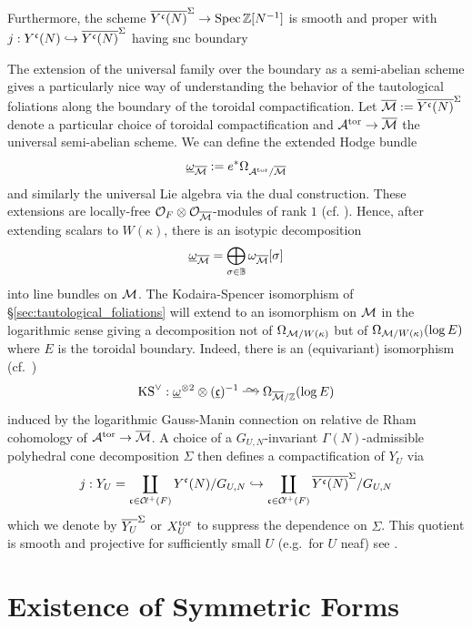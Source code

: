 \documentclass[main.tex]{subfiles}
\begin{document}
{Furthermore, the scheme $\overline{Y^{\mathfrak{c}}(N)}^{\Sigma} \to \operatorname{\mathrm{Spec}}{\mathbb{Z}[N^{-1}]}$ is smooth and proper with $j : Y^{\mathfrak{c}}(N) \hookrightarrow \overline{Y^{\mathfrak{c}}(N)}^{\Sigma}$ having snc boundary \cite[Corollaire~5.3]{rapoport:compactifications}
\par 
The extension of the universal family over the boundary as a semi-abelian scheme gives a particularly nice way of understanding the behavior of the tautological foliations along the boundary of the toroidal compactification. Let $\overline{\mathcal{M}} :=  \overline{Y^{\mathfrak{c}}(N)}^{\Sigma}$ denote a particular choice of toroidal compactification and $\mathcal{A}^{\mathrm{tor}} \to \overline{\mathcal{M}}$ the universal semi-abelian scheme. We can define the extended Hodge bundle
\[ \underline{\omega}_{\overline{\mathcal{M}}} := e^* \Omega_{\mathcal{A}^{\mathrm{tor}} / \overline{\mathcal{M}}} \]
and similarly the universal Lie algebra via the dual construction. These extensions are locally-free $\mathcal{O}_F \otimes \mathcal{O}_{\overline{\mathcal{M}}}$-modules of rank $1$ (cf. \cite[Corollaire~4.4]{rapoport:compactifications}). Hence, after extending scalars to $W(\kappa)$, there is an isotypic decomposition
\[ \underline{\omega}_{\overline{\mathcal{M}}} = \bigoplus_{\sigma \in \mathbb{B}} \omega_{\overline{\mathcal{M}}}[\sigma] \]
into line bundles on $\mathcal{M}$. The Kodaira-Spencer isomorphism of \S\ref{sec:tautological_foliations} will extend to an isomorphism on $\mathcal{M}$ in the logarithmic sense giving a decomposition not of $\Omega_{\mathcal{M} / W(\kappa)}$ but of $\Omega_{\mathcal{M} / W(\kappa)}(\log{E})$ where $E$ is the toroidal boundary. Indeed, there is an (equivariant) isomorphism \cite[Theorem~6.4.1.1]{lan:compactifications_PEL} (cf.\ \cite[\S2.11]{tian_xiao:cohomology_and_classicality})
\begin{equation} \label{eq:extended_kodaira_spencer}
\KS^{\vee} : \ul{\omega}^{\ot 2} \ot (\ul{\cc})^{-1} \iso \Omega_{\ol{\cM}/\ZZ}(\log{E})
\end{equation}
induced by the logarithmic Gauss-Manin connection on relative de Rham cohomology of $\mathcal{A}^{\mathrm{tor}} \to \overline{\mathcal{M}}$. A choice of a $G_{U,N}$-invariant $\Gamma(N)$-admissible polyhedral cone decomposition $\Sigma$ then defines a compactification of $Y_U$ via
\[ j : Y_U = \coprod_{\mathfrak{c} \in \operatorname{\mathcal{C}\!{\ell}}^+(F)} Y^{\mathfrak{c}}(N) / G_{U,N} \hookrightarrow \coprod_{\mathfrak{c} \in \operatorname{\mathcal{C}\!{\ell}}^+(F)} \overline{Y^{\mathfrak{c}}(N)}^{\Sigma} / G_{U,N} \]
which we denote by $\overline{Y_U}^{\Sigma}$ or $X_U^{\mathrm{tor}}$ to suppress the dependence on $\Sigma$. This quotient is smooth and projective for sufficiently small $U$ (e.g.\ for $U$ neaf) see \cite[p.9]{yang:geometric_serre}.


\section{Existence of Symmetric Forms} \label{sec:existence_of_symmetric_forms_hilbert}

}
\end{document}
